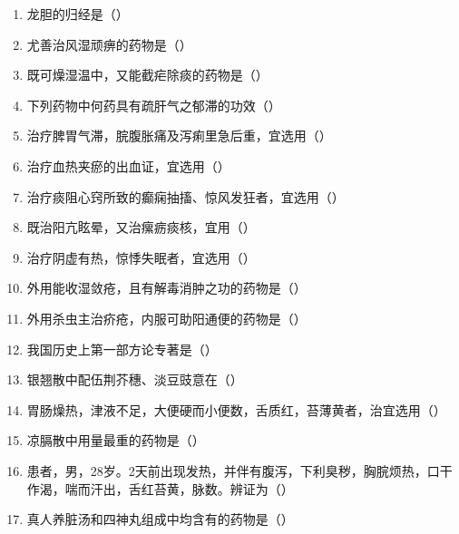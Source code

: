 \documentclass[a4paper,11pt]{ctexart}
\begin{document}
\begin{enumerate}
      \item 龙胆的归经是（\quad）
      \item 尤善治风湿顽痹的药物是（\quad）
      \item 既可燥湿温中，又能截疟除痰的药物是（\quad）
      \item 下列药物中何药具有疏肝气之郁滞的功效（\quad）
      \item 治疗脾胃气滞，脘腹胀痛及泻痢里急后重，宜选用（\quad）
      \item 治疗血热夹瘀的出血证，宜选用（\quad）
      \item 治疗痰阻心窍所致的癫痫抽搐、惊风发狂者，宜选用（\quad）
      \item 既治阳亢眩晕，又治瘰疬痰核，宜用（\quad）
      \item 治疗阴虚有热，惊悸失眠者，宜选用（\quad）
      \item 外用能收湿敛疮，且有解毒消肿之功的药物是（\quad）
      \item 外用杀虫主治疥疮，内服可助阳通便的药物是（\quad）
      \item 我国历史上第一部方论专著是（\quad）
      \item 银翘散中配伍荆芥穗、淡豆豉意在（\quad）
      \item 胃肠燥热，津液不足，大便硬而小便数，舌质红，苔薄黄者，治宜选用（\quad）
      \item 凉膈散中用量最重的药物是（\quad）
      \item 患者，男，28岁。2天前出现发热，并伴有腹泻，下利臭秽，胸脘烦热，口干作渴，喘而汗出，舌红苔黄，脉数。辨证为（\quad）
      \item 真人养脏汤和四神丸组成中均含有的药物是（\quad）

\end{enumerate}
\end{document}
